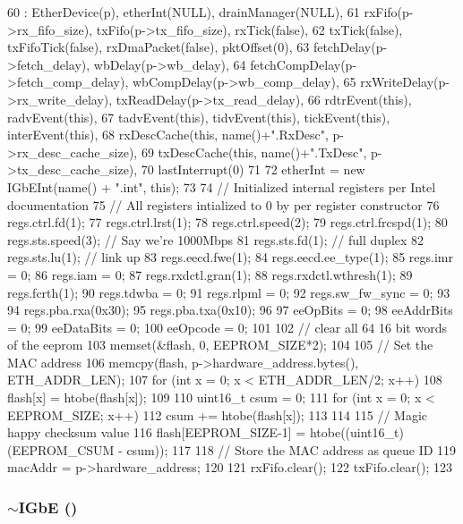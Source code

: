 \begin{DoxyCode}
60     : EtherDevice(p), etherInt(NULL),  drainManager(NULL),
61       rxFifo(p->rx_fifo_size), txFifo(p->tx_fifo_size), rxTick(false),
62       txTick(false), txFifoTick(false), rxDmaPacket(false), pktOffset(0),
63       fetchDelay(p->fetch_delay), wbDelay(p->wb_delay), 
64       fetchCompDelay(p->fetch_comp_delay), wbCompDelay(p->wb_comp_delay), 
65       rxWriteDelay(p->rx_write_delay), txReadDelay(p->tx_read_delay),  
66       rdtrEvent(this), radvEvent(this),
67       tadvEvent(this), tidvEvent(this), tickEvent(this), interEvent(this),
68       rxDescCache(this, name()+".RxDesc", p->rx_desc_cache_size),
69       txDescCache(this, name()+".TxDesc", p->tx_desc_cache_size),
70       lastInterrupt(0)
71 {
72     etherInt = new IGbEInt(name() + ".int", this);
73 
74     // Initialized internal registers per Intel documentation
75     // All registers intialized to 0 by per register constructor
76     regs.ctrl.fd(1);
77     regs.ctrl.lrst(1);
78     regs.ctrl.speed(2);
79     regs.ctrl.frcspd(1);
80     regs.sts.speed(3); // Say we're 1000Mbps
81     regs.sts.fd(1); // full duplex
82     regs.sts.lu(1); // link up
83     regs.eecd.fwe(1);
84     regs.eecd.ee_type(1);
85     regs.imr = 0;
86     regs.iam = 0;
87     regs.rxdctl.gran(1);
88     regs.rxdctl.wthresh(1);
89     regs.fcrth(1);
90     regs.tdwba = 0;
91     regs.rlpml = 0;
92     regs.sw_fw_sync = 0;
93 
94     regs.pba.rxa(0x30);
95     regs.pba.txa(0x10);
96 
97     eeOpBits            = 0;
98     eeAddrBits          = 0;
99     eeDataBits          = 0;
100     eeOpcode            = 0;
101 
102     // clear all 64 16 bit words of the eeprom
103     memset(&flash, 0, EEPROM_SIZE*2);
104 
105     // Set the MAC address
106     memcpy(flash, p->hardware_address.bytes(), ETH_ADDR_LEN);
107     for (int x = 0; x < ETH_ADDR_LEN/2; x++)
108         flash[x] = htobe(flash[x]);
109 
110     uint16_t csum = 0;
111     for (int x = 0; x < EEPROM_SIZE; x++)
112         csum += htobe(flash[x]);
113 
114 
115     // Magic happy checksum value
116     flash[EEPROM_SIZE-1] = htobe((uint16_t)(EEPROM_CSUM - csum));
117 
118     // Store the MAC address as queue ID
119     macAddr = p->hardware_address;
120 
121     rxFifo.clear();
122     txFifo.clear();
123 }
\end{DoxyCode}
\hypertarget{classIGbE_a8ff05c4d178fcac0d8a3ae83db67d89b}{
\subsubsection[{$\sim$IGbE}]{\setlength{\rightskip}{0pt plus 5cm}$\sim${\bf IGbE} ()}}
\label{classIGbE_a8ff05c4d178fcac0d8a3ae83db67d89b}



